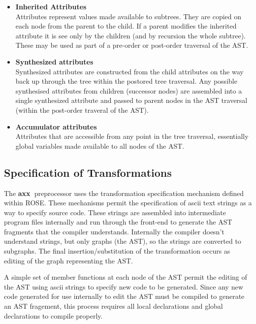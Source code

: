 \documentclass[10pt]{article}
\newcommand{\axx}{{\bf axx\ }}
\begin{document}
\begin{itemize}
     \item {\bf Inherited Attributes} \\ Attributes represent values made available to
           subtrees. They are copied on each node from the parent to the child. If a parent modifies
           the inherited attribute it is see only by the children (and by recursion the whole
           subtree). These may be used as part of a pre-order or post-order traversal of the AST.

     \item {\bf Synthesized attributes} \\ Synthesized attributes are constructed from the child
           attributes on the way back up through the tree within the postored tree traversal. Any
           possible synthesised attributes from children (successor nodes) are assembled into a
           single synthesized attribute and passed to parent nodes in the AST traversal (within the
           post-order traveral of the AST).

     \item {\bf Accumulator attributes} \\ Attributes that are accessible from any point in the tree
           traversal, essentially global variables made available to all nodes of the AST.
\end{itemize}

\subsection{Specification of Transformations}

    The \axx preprocessor uses the transformation specification mechanism defined within ROSE. These
mechanisms permit the specification of ascii text strings as a way to specify source code.  These
strings are assembled into intermediate program files internally and run through the front-end to
generate the AST fragments that the compiler understands.  Internally the compiler doesn't
understand strings, but only graphs (the AST), so the strings are converted to subgraphs.  The final
insertion/substitution of the transformation occurs as editing of the graph representing the AST.

A simple set of member functions at each node of the AST permit the editing of the AST using ascii strings to
specify new code to be generated.  Since any new code generated for use internally to edit the AST must be compiled to
generate an AST fragement, this process requires all local declarations and global declarations to compile properly.
\end{document}

